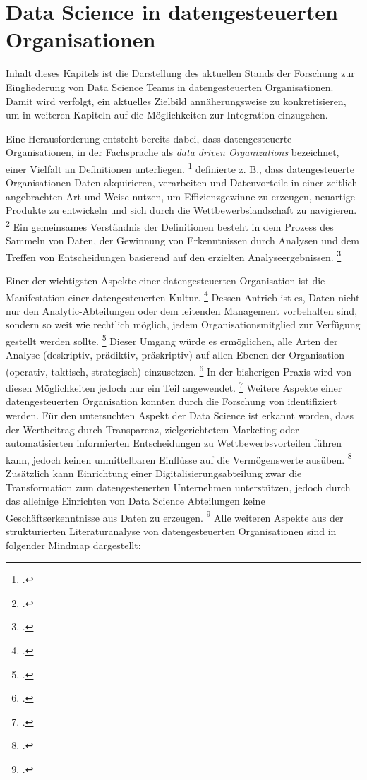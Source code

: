 \chapter{Data Science in datengesteuerten Organisationen}

Inhalt dieses Kapitels ist die Darstellung des aktuellen Stands der Forschung zur Eingliederung von Data Science Teams in datengesteuerten Organisationen.
Damit wird verfolgt, ein aktuelles Zielbild annäherungsweise zu konkretisieren, um in weiteren Kapiteln auf die Möglichkeiten zur Integration einzugehen.

Eine Herausforderung entsteht bereits dabei, dass datengesteuerte Organisationen, in der Fachsprache als \textit{data driven Organizations} bezeichnet, einer Vielfalt an Definitionen unterliegen. \footcite[prenote][postnote]{(several definitons of DDOs)}
 definierte z. B., dass datengesteuerte Organisationen Daten akquirieren, verarbeiten und Datenvorteile in einer zeitlich angebrachten Art und Weise nutzen, um Effizienzgewinne zu erzeugen, neuartige Produkte zu entwickeln und sich durch die Wettbewerbslandschaft zu navigieren. \footcite[prenote][postnote]{DDO definition}
Ein gemeinsames Verständnis der Definitionen besteht in dem Prozess des Sammeln von Daten, der Gewinnung von Erkenntnissen durch Analysen und dem Treffen von Entscheidungen basierend auf den erzielten Analyseergebnissen. \footcite[prenote][postnote]{looking into DDO definitions}

Einer der wichtigsten Aspekte einer datengesteuerten Organisation ist die Manifestation einer datengesteuerten Kultur. \footcite[prenote][postnote]{data-driven culture}
Dessen Antrieb ist es, Daten nicht nur den Analytic-Abteilungen oder dem leitenden Management vorbehalten sind, sondern so weit wie rechtlich möglich, jedem Organisationsmitglied zur Verfügung gestellt werden sollte. \footcite[prenote][postnote]{ddos democratize data}
Dieser Umgang würde es ermöglichen, alle Arten der Analyse (deskriptiv, prädiktiv, präskriptiv) auf allen Ebenen der Organisation (operativ, taktisch, strategisch) einzusetzen. \footcite[prenote][postnote]{typees of analytics}
In der bisherigen Praxis wird von diesen Möglichkeiten jedoch nur ein Teil angewendet. \footcite[prenote][postnote]{typees}
Weitere Aspekte einer datengesteuerten Organisation konnten durch die Forschung von  identifiziert werden.
Für den untersuchten Aspekt der Data Science ist erkannt worden, dass der Wertbeitrag durch Transparenz, zielgerichtetem Marketing oder automatisierten informierten Entscheidungen zu Wettbewerbsvorteilen führen kann, jedoch keinen unmittelbaren Einflüsse auf die Vermögenswerte ausüben. \footcite[prenote][postnote]{data science brings value}
Zusätzlich kann Einrichtung einer Digitalisierungsabteilung zwar die Transformation zum datengesteuerten Unternehmen unterstützen, jedoch durch das alleinige Einrichten von Data Science Abteilungen keine Geschäftserkenntnisse aus Daten zu erzeugen. \footcite[prenote][postnote]{data science teams}
Alle weiteren Aspekte aus der strukturierten Literaturanalyse von datengesteuerten Organisationen sind in folgender Mindmap dargestellt:

